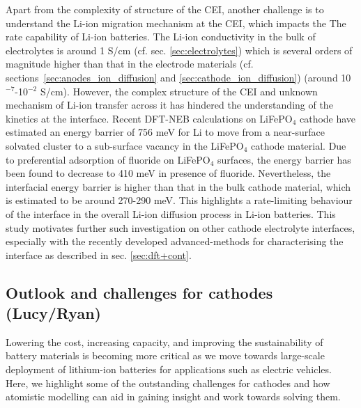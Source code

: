 \documentclass[../main.tex]{subfiles}
\begin{document}
Apart from the complexity of structure of the CEI, another challenge is to understand the Li-ion migration mechanism at the CEI, which impacts the The rate capability of Li-ion batteries. The Li-ion conductivity in the bulk of electrolytes is around 1 S/cm (cf. sec. \ref{sec:electrolytes}) which is several orders of magnitude higher than that in the electrode materials (cf. sections~\ref{sec:anodes_ion_diffusion} and \ref{sec:cathode_ion_diffusion}) (around 10$^{-7}$-10$^{-2}$ S/cm).\cite{Park2010, VanDerVen2013} However, the complex structure of the CEI and unknown mechanism of Li-ion transfer across it has hindered the understanding of the kinetics at the interface. Recent DFT-NEB calculations on LiFePO$_4$ cathode have estimated an energy barrier of 756 meV for Li to move from a near-surface solvated cluster to a sub-surface vacancy in the LiFePO$_4$ cathode material.\cite{Bhandari2019} Due to preferential adsorption of fluoride on LiFePO$_4$ surfaces,\cite{Edstrom2004, Bhandari2020} the energy barrier has been found to decrease to 410 meV in presence of fluoride. Nevertheless, the interfacial energy barrier is higher than that in the bulk cathode material, which is estimated to be around 270-290 meV.\cite{Morgan2004,Dathar2011} This highlights a rate-limiting behaviour of the interface in the overall Li-ion diffusion process in Li-ion batteries. This study motivates further such investigation on other cathode electrolyte interfaces, especially with the recently developed advanced-methods for characterising the interface as described in sec. \ref{sec:dft+cont}.  

\subsection{Outlook and challenges for cathodes (Lucy/Ryan)}
Lowering the cost, increasing capacity, and improving the sustainability of battery materials is becoming more critical as we move towards large-scale deployment of lithium-ion batteries for applications such as electric vehicles. \cite{dunn2011electrical} Here, we highlight some of the outstanding challenges for cathodes and how atomistic modelling can aid in gaining insight and work towards solving them.
\end{document}
